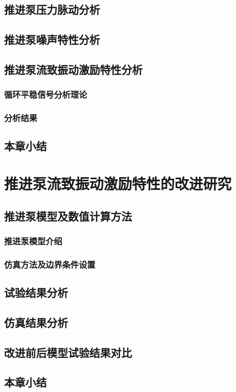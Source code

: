 \section{推进泵压力脉动分析}
\section{推进泵噪声特性分析}
\section{推进泵流致振动激励特性分析}
\subsection{循环平稳信号分析理论}
\subsection{分析结果}
\section{本章小结}

\chapter{推进泵流致振动激励特性的改进研究}
\section{推进泵模型及数值计算方法}
\subsection{推进泵模型介绍}
\subsection{仿真方法及边界条件设置}
\section{试验结果分析}
\section{仿真结果分析}
\section{改进前后模型试验结果对比}
\section{本章小结}

